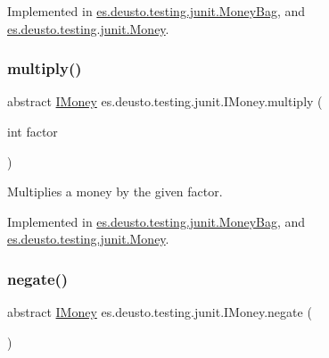 Implemented in \mbox{\hyperlink{classes_1_1deusto_1_1testing_1_1junit_1_1_money_bag_abebc5bc39c3343cb3c4e5fb291fd5893}{es.\+deusto.\+testing.\+junit.\+Money\+Bag}}, and \mbox{\hyperlink{classes_1_1deusto_1_1testing_1_1junit_1_1_money_a797658a03260b535e9a36ebbcc3b19c9}{es.\+deusto.\+testing.\+junit.\+Money}}.

\mbox{\label{interfacees_1_1deusto_1_1testing_1_1junit_1_1_i_money_a09154f9713133d4734f72d6a20081209}} 
\subsubsection{\texorpdfstring{multiply()}{multiply()}}
{\footnotesize\ttfamily abstract \mbox{\hyperlink{interfacees_1_1deusto_1_1testing_1_1junit_1_1_i_money}{I\+Money}} es.\+deusto.\+testing.\+junit.\+I\+Money.\+multiply (\begin{DoxyParamCaption}\item[{int}]{factor }\end{DoxyParamCaption})\hspace{0.3cm}{\ttfamily [abstract]}}

Multiplies a money by the given factor. 

Implemented in \mbox{\hyperlink{classes_1_1deusto_1_1testing_1_1junit_1_1_money_bag_aa20ce4cc70c2ba0bc9a5ccb96635d506}{es.\+deusto.\+testing.\+junit.\+Money\+Bag}}, and \mbox{\hyperlink{classes_1_1deusto_1_1testing_1_1junit_1_1_money_a02c7d4e9013710f70d1d46e9c9ebae88}{es.\+deusto.\+testing.\+junit.\+Money}}.

\mbox{\label{interfacees_1_1deusto_1_1testing_1_1junit_1_1_i_money_a741967d7aa89055b6873619303b11385}} 
\subsubsection{\texorpdfstring{negate()}{negate()}}
{\footnotesize\ttfamily abstract \mbox{\hyperlink{interfacees_1_1deusto_1_1testing_1_1junit_1_1_i_money}{I\+Money}} es.\+deusto.\+testing.\+junit.\+I\+Money.\+negate (\begin{DoxyParamCaption}{ }\end{DoxyParamCaption})\hspace{0.3cm}{\ttfamily [abstract]}}

